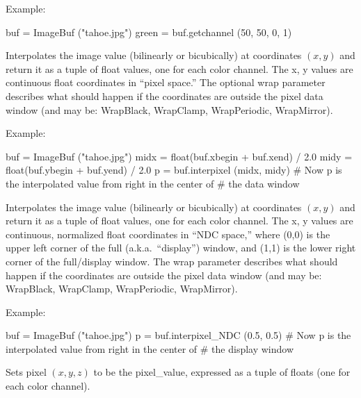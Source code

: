 \noindent Example:
\begin{code}
    buf = ImageBuf ("tahoe.jpg")
    green = buf.getchannel (50, 50, 0, 1)
\end{code}
\apiend

Interpolates the image value (bilinearly or bicubically)
at coordinates $(x,y)$ and return it as a tuple
of {\cf float} values, one for each color channel.  The {\cf x, y} values
are continuous {\cf float} coordinates in ``pixel space.''   The optional
{\cf wrap} parameter describes what should happen if the coordinates are
outside the pixel data window (and may be: {\cf WrapBlack, WrapClamp,
WrapPeriodic, WrapMirror}).

\noindent Example:
\begin{code}
    buf = ImageBuf ("tahoe.jpg")
    midx = float(buf.xbegin + buf.xend) / 2.0
    midy = float(buf.ybegin + buf.yend) / 2.0
    p = buf.interpixel (midx, midy)
    # Now p is the interpolated value from right in the center of
    # the data window
\end{code}
\apiend


Interpolates the image value (bilinearly or bicubically)
at coordinates $(x,y)$ and return it as a tuple
of {\cf float} values, one for each color channel.  The {\cf x, y} values
are continuous, normalized {\cf float} coordinates in ``NDC space,'' where
{\cf (0,0)} is the upper left corner of the full (a.k.a.\ ``display'')
window, and {\cf (1,1)} is the lower right corner of the full/display
window. The  {\cf wrap} parameter describes what should happen if the
coordinates are outside the pixel data window (and may be: {\cf WrapBlack,
WrapClamp, WrapPeriodic, WrapMirror}).

\noindent Example:
\begin{code}
    buf = ImageBuf ("tahoe.jpg")
    p = buf.interpixel_NDC (0.5, 0.5)
    # Now p is the interpolated value from right in the center of
    # the display window
\end{code}
\apiend

Sets pixel $(x,y,z)$ to be the {\cf pixel_value}, expressed as a tuple of
{\cf float}s (one for each color channel).

